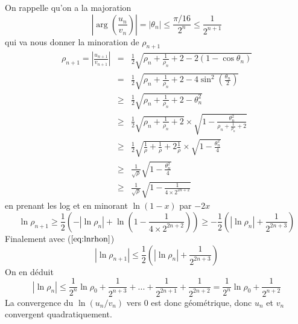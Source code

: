 \documentclass[a4paper,11pt]{book}
\begin{document}
\begin{giacjshere}
\begin{equation}
\end{equation}
On rappelle qu'on a la majoration 
\[ |\arg(\frac{u_n}{v_n})| = |\theta_n| \leq \frac{\pi/16}{2^n} \leq \frac{1}{2^{n+1}} \]
qui va nous donner la minoration de $\rho_{n+1}$ 
\begin{eqnarray*}
\rho_{n+1}=|\frac{u_{n+1}}{v_{n+1}}| & = & \frac{1}{2}
\sqrt{ \rho_n+ \frac{1}{\rho_n} +2 - 2 (1-\cos \theta_n) } \\
& = &  \frac{1}{2} \sqrt{ \rho_n+ \frac{1}{\rho_n} +2 - 4 \sin^2 (\frac{\theta_n}{2}) } \\
& \geq &  \frac{1}{2} \sqrt{ \rho_n+ \frac{1}{\rho_n} +2 - \theta_n^2} \\
& \geq &  \frac{1}{2} \sqrt{ \rho_n+ \frac{1}{\rho_n} +2} \times 
\sqrt{1 - \frac{\theta_n^2}{\rho_n+ \frac{1}{\rho_n} +2}} \\
& \geq &  \frac{1}{2} \sqrt{ \frac{1}{\rho} + \frac{1}{\rho} +2\frac{1}{\rho}} \times 
\sqrt{1 - \frac{\theta_n^2}{4}} \\
& \geq & \frac{1}{\sqrt{\rho}} \sqrt{1 - \frac{\theta_n^2}{4}} \\
& \geq & \frac{1}{\sqrt{\rho}} \sqrt{1 - \frac{1} {4 \times 2^{2n+2}}}
\end{eqnarray*}
en prenant les log et en minorant $\ln(1-x)$ par $-2x$
\[ \ln \rho_{n+1} \geq \frac{1}{2} (-|\ln \rho_n|+\ln(1 -\frac{1} {4 \times 2^{2n+2}} ))
\geq -\frac{1}{2} (|\ln \rho_n|+\frac{1} {2^{2n+3}} )  \]
Finalement avec (\(\ref{eq:lnrhon}\))
\[ |\ln \rho_{n+1}|
\leq \frac{1}{2} (|\ln \rho_n|+\frac{1}{2^{2n+3}} ) \]
On en déduit
\[ |\ln \rho_n| \leq \frac{1}{2^n} \ln \rho_0 + \frac{1}{2^{n+3}} + ... +
\frac{1}{2^{2n+1}} +  \frac{1}{2^{2n+2}}
= \frac{1}{2^n} \ln \rho_0 + \frac{1}{2^{n+2}} \]
La convergence du $\ln(u_n/v_n)$ vers 0 est donc géométrique, donc $u_n$ et $v_n$ convergent
quadratiquement.


\end{giacjshere}
\end{document}
